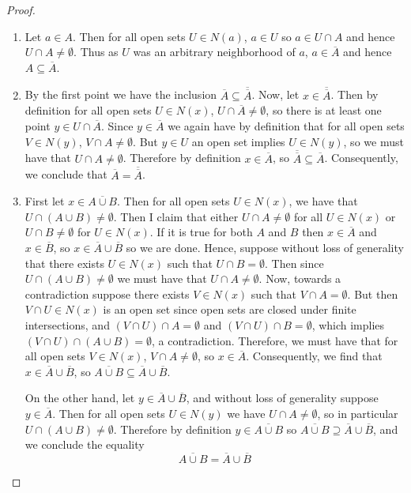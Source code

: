 \begin{proof}
    \leavevmode
    \begin{enumerate}
        \item Let $a \in A$. Then for all open sets $U \in N(a)$, $a \in U$ so $a \in U\cap A$ and hence $U\cap A \neq \emptyset$. Thus as $U$ was an arbitrary neighborhood of $a$, $a \in \overline{A}$ and hence $A \subseteq \overline{A}$.
        \item By the first point we have the inclusion $\overline{A} \subseteq \overline{\overline{A}}$. Now, let $x \in \overline{\overline{A}}$. Then by definition for all open sets $U \in N(x)$, $U \cap \overline{A} \neq \emptyset$, so there is at least one point $y \in U \cap \overline{A}$. Since $y \in \overline{A}$ we again have by definition that for all open sets $V \in N(y)$, $V \cap A \neq \emptyset$. But $y \in U$ an open set implies $U \in N(y)$, so we must have that $U \cap A \neq \emptyset$. Therefore by definition $x \in \overline{A}$, so $\overline{\overline{A}} \subseteq \overline{A}$. Consequently, we conclude that $\overline{A} = \overline{\overline{A}}$.
        \item First let $x \in \overline{A\cup B}$. Then for all open sets $U \in N(x)$, we have that $U \cap(A\cup B) \neq \emptyset$. Then I claim that either $U\cap A \neq \emptyset$ for all $U \in N(x)$ or $U\cap B \neq \emptyset$ for $U \in N(x)$. If it is true for both $A$ and $B$ then $x \in \overline{A}$ and $x \in \overline{B}$, so $x \in \overline{A}\cup\overline{B}$ so we are done. Hence, suppose without loss of generality that there exists $U \in N(x)$ such that $U\cap B = \emptyset$. Then since $U\cap(A\cup B) \neq \emptyset$ we must have that $U \cap A\neq \emptyset$. Now, towards a contradiction suppose there exists $V \in N(x)$ such that $V\cap A = \emptyset$. But then $V\cap U \in N(x)$ is an open set since open sets are closed under finite intersections, and $(V\cap U)\cap A = \emptyset$ and $(V\cap U)\cap B = \emptyset$, which implies $(V\cap U)\cap (A\cup B) = \emptyset$, a contradiction. Therefore, we must have that for all open sets $V \in N(x)$, $V\cap A \neq \emptyset$, so $x \in \overline{A}$. Consequently, we find that $x \in \overline{A}\cup\overline{B}$, so $\overline{A\cup B} \subseteq \overline{A}\cup\overline{B}$.

            On the other hand, let $y \in \overline{A} \cup \overline{B}$, and without loss of generality suppose $y \in \overline{A}$. Then for all open sets $U \in N(y)$ we have $U \cap A \neq \emptyset$, so in particular $U \cap (A\cup B) \neq \emptyset$. Therefore by definition $y \in \overline{A\cup B}$ so $\overline{A\cup B}\supseteq \overline{A}\cup\overline{B}$, and we conclude the equality $$\overline{A\cup B} = \overline{A}\cup\overline{B}$$


\end{enumerate}
\end{proof}
